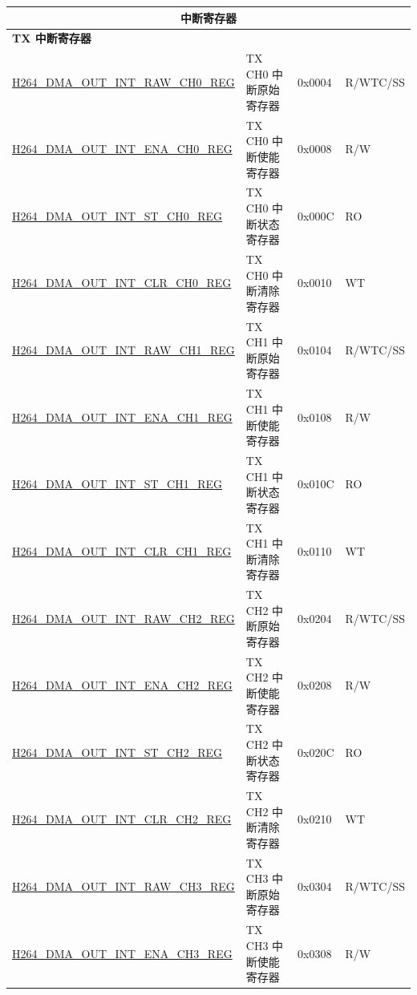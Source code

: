 \begin{longtable}{ | p{7.5cm} | p{5.7cm} | p{1.2cm} | p{1.5cm} | }
\multicolumn{4}{|c|}{\cellcolor{gray!15}\textbf{中断寄存器}} \\ \hline
\multicolumn{4}{|l|}{\textbf{TX 中断寄存器}} \\ \hline
    \hyperref[regdesc:H264DMAOUTINTRAWCH0REG]{H264\_DMA\_OUT\_INT\_RAW\_CH0\_REG} & TX CH0 中断原始寄存器 & 0x0004 & R/WTC/SS \\ \hline
    \hyperref[regdesc:H264DMAOUTINTENACH0REG]{H264\_DMA\_OUT\_INT\_ENA\_CH0\_REG} & TX CH0 中断使能寄存器 & 0x0008 & R/W \\ \hline
    \hyperref[regdesc:H264DMAOUTINTSTCH0REG]{H264\_DMA\_OUT\_INT\_ST\_CH0\_REG} & TX CH0 中断状态寄存器 & 0x000C & RO \\ \hline
    \hyperref[regdesc:H264DMAOUTINTCLRCH0REG]{H264\_DMA\_OUT\_INT\_CLR\_CH0\_REG} & TX CH0 中断清除寄存器 & 0x0010 & WT \\ \hline
    \hyperref[regdesc:H264DMAOUTINTRAWCH1REG]{H264\_DMA\_OUT\_INT\_RAW\_CH1\_REG} & TX CH1 中断原始寄存器 & 0x0104 & R/WTC/SS \\ \hline
    \hyperref[regdesc:H264DMAOUTINTENACH1REG]{H264\_DMA\_OUT\_INT\_ENA\_CH1\_REG} & TX CH1 中断使能寄存器 & 0x0108 & R/W \\ \hline
    \hyperref[regdesc:H264DMAOUTINTSTCH1REG]{H264\_DMA\_OUT\_INT\_ST\_CH1\_REG} & TX CH1 中断状态寄存器 & 0x010C & RO \\ \hline
    \hyperref[regdesc:H264DMAOUTINTCLRCH1REG]{H264\_DMA\_OUT\_INT\_CLR\_CH1\_REG} & TX CH1 中断清除寄存器 & 0x0110 & WT \\ \hline
    \hyperref[regdesc:H264DMAOUTINTRAWCH2REG]{H264\_DMA\_OUT\_INT\_RAW\_CH2\_REG} & TX CH2 中断原始寄存器 & 0x0204 & R/WTC/SS \\ \hline
    \hyperref[regdesc:H264DMAOUTINTENACH2REG]{H264\_DMA\_OUT\_INT\_ENA\_CH2\_REG} & TX CH2 中断使能寄存器 & 0x0208 & R/W \\ \hline
    \hyperref[regdesc:H264DMAOUTINTSTCH2REG]{H264\_DMA\_OUT\_INT\_ST\_CH2\_REG} & TX CH2 中断状态寄存器 & 0x020C & RO \\ \hline
    \hyperref[regdesc:H264DMAOUTINTCLRCH2REG]{H264\_DMA\_OUT\_INT\_CLR\_CH2\_REG} & TX CH2 中断清除寄存器 & 0x0210 & WT \\ \hline
    \hyperref[regdesc:H264DMAOUTINTRAWCH3REG]{H264\_DMA\_OUT\_INT\_RAW\_CH3\_REG} & TX CH3 中断原始寄存器 & 0x0304 & R/WTC/SS \\ \hline
    \hyperref[regdesc:H264DMAOUTINTENACH3REG]{H264\_DMA\_OUT\_INT\_ENA\_CH3\_REG} & TX CH3 中断使能寄存器 & 0x0308 & R/W \\ \hline

\end{longtable}
